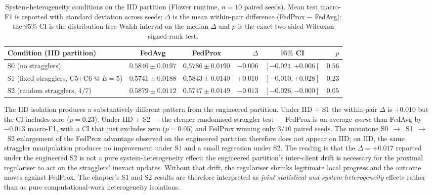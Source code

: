 \documentclass[11pt,a4paper]{report}
\begin{document}
\begin{table}[!htbp]
\centering
\caption{System-heterogeneity conditions on the IID partition
(Flower runtime, $n = 10$ paired seeds). Mean test macro-F1 is
reported with standard deviation across seeds; $\Delta$ is the
mean within-pair difference (FedProx $-$ FedAvg); the $95\%$ CI
is the distribution-free Walsh interval on the median $\Delta$
and $p$ is the exact two-sided Wilcoxon signed-rank test.}
\label{tab:sh-iid-isolation}
\small
\setlength{\tabcolsep}{4pt}
\renewcommand{\arraystretch}{1.15}
\begin{tabular}{@{}l c c r c r@{}}
\toprule
Condition (IID partition)             & FedAvg              & FedProx             & $\Delta$  & $95\%$ CI         & $p$    \\
\midrule
S0 (no stragglers)                    & $0.5846 \pm 0.0197$ & $0.5786 \pm 0.0190$ & $-0.006$  & $[-0.021, +0.006]$ & $0.56$ \\
S1 (fixed stragglers, C5+C6 @ $E=5$)  & $0.5741 \pm 0.0188$ & $0.5843 \pm 0.0140$ & $+0.010$  & $[-0.010, +0.028]$ & $0.23$ \\
S2 (random stragglers, $4/7$)         & $0.5879 \pm 0.0112$ & $0.5747 \pm 0.0149$ & $-0.013$  & $[-0.026, -0.000]$ & $0.05$ \\
\bottomrule
\end{tabular}
\end{table}

The IID isolation produces a substantively different pattern
from the engineered partition. Under IID + S1 the within-pair
$\Delta$ is $+0.010$ but the CI includes zero
($p = 0.23$). Under IID + S2 --- the cleaner randomised
straggler test --- FedProx is on average \emph{worse} than
FedAvg by $-0.013$ macro-F1, with a CI that just excludes zero
($p = 0.05$) and FedProx winning only $3/10$ paired seeds.
The monotone S0~$\to$~S1~$\to$~S2 enlargement of the FedProx
advantage observed on the engineered partition therefore does
not appear on IID; on IID, the same straggler manipulation
produces no improvement under S1 and a small regression under
S2. The reading is that the $\Delta = +0.017$ reported under
the engineered S2 is not a pure system-heterogeneity effect:
the engineered partition's inter-client drift is necessary for
the proximal regulariser to act on the stragglers' inexact
updates. Without that drift, the regulariser shrinks legitimate
local progress and the outcome moves against FedProx. The
chapter's S1 and S2 results are therefore interpreted as
\emph{joint statistical-and-system-heterogeneity} effects rather
than as pure computational-work heterogeneity isolations.
\end{document}
